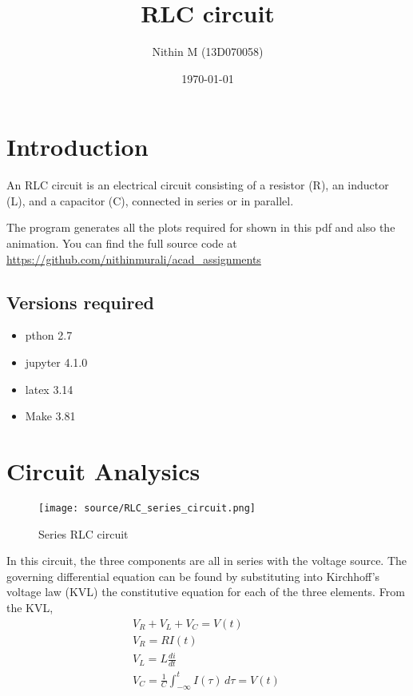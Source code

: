 \documentclass[11pt]{article}
\title{RLC circuit}
\author{Nithin M (13D070058) }
\date{\today}
\begin{document}
\maketitle

\section{Introduction}
An RLC circuit is an electrical circuit consisting of a resistor (R), an inductor (L), and a capacitor (C), connected in series or in parallel. 

The program generates all the plots required for shown in this pdf and also the animation. You can find the full source code at \url{https://github.com/nithinmurali/acad_assignments}

\subsection{Versions required}
\begin{itemize}
\item pthon 2.7
\item jupyter 4.1.0
\item latex 3.14
\item Make 3.81
\end{itemize}



\section{Circuit Analysics}
\begin{figure}[H]
	\begin{center}
	\texttt{[image: source/RLC\_series\_circuit.png]}
	\caption{Series RLC circuit}
	\centering
	\end{center}
\end{figure}

In this circuit, the three components are all in series with the voltage source. The governing differential equation can be found by substituting into Kirchhoff's voltage law (KVL) the constitutive equation for each of the three elements. 
\hfil \break
From the KVL, 
\begin{eqnarray*}
V_R + V_L + V_C = V(t) \\
V_R = RI(t) \\
V_L = L\frac{di}{dt} \\
V_C = \frac{1}{C}\int_{-\infty}^t I(\tau)\, d\tau = V(t)\
\end{eqnarray*}
\end{document}
